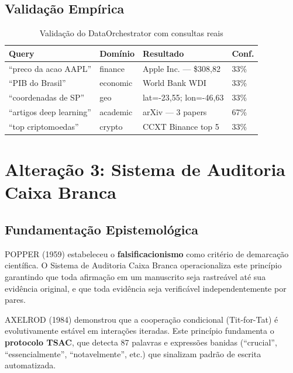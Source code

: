 \documentclass[12pt,a4paper]{article}
\begin{document}
\subsection{Validação Empírica}

\begin{table}[H]
  \centering
  \caption{Validação do DataOrchestrator com consultas reais}
  \begin{tabular}{l l l l}
    \toprule
    \textbf{Query} & \textbf{Domínio} & \textbf{Resultado} & \textbf{Conf.} \\
    \midrule
    ``preco da acao AAPL''   & finance   & Apple Inc. --- \$308,82   & 33\% \\
    ``PIB do Brasil''        & economic  & World Bank WDI            & 33\% \\
    ``coordenadas de SP''    & geo       & lat=-23,55; lon=-46,63    & 33\% \\
    ``artigos deep learning''& academic  & arXiv --- 3 papers        & 67\% \\
    ``top criptomoedas''     & crypto    & CCXT Binance top 5        & 33\% \\
    \bottomrule
  \end{tabular}
\end{table}

\section{Alteração 3: Sistema de Auditoria Caixa Branca}

\subsection{Fundamentação Epistemológica}

POPPER (1959) estabeleceu o \textbf{falsificacionismo} como critério de demarcação científica. O Sistema de Auditoria Caixa Branca operacionaliza este princípio garantindo que toda afirmação em um manuscrito seja rastreável até sua evidência original, e que toda evidência seja verificável independentemente por pares.

AXELROD (1984) demonstrou que a cooperação condicional (Tit-for-Tat) é evolutivamente estável em interações iteradas. Este princípio fundamenta o \textbf{protocolo TSAC}, que detecta 87 palavras e expressões banidas (``crucial'', ``essencialmente'', ``notavelmente'', etc.) que sinalizam padrão de escrita automatizada.
\end{document}
